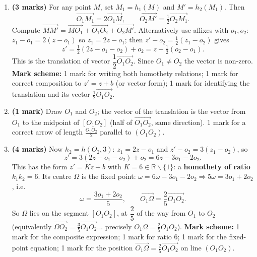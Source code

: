 \documentclass[11pt]{article}
\def\setminus{\mathbin{\backslash}}\let\smallsetminus\setminus
\begin{document}
\begin{corrige}
\begin{enumerate}
\item \textbf{(3 marks)} For any point $M$, set $M_1 = h_1(M)$ and $M' = h_2(M_1)$. Then
\[ \overrightarrow{O_1 M_1} = 2\overrightarrow{O_1 M}, \qquad \overrightarrow{O_2 M'} = \tfrac12 \overrightarrow{O_2 M_1}. \]
Compute $\overrightarrow{MM'} = \overrightarrow{MO_1} + \overrightarrow{O_1O_2} + \overrightarrow{O_2M'}$. Alternatively use affixes with $o_1, o_2$: $z_1 - o_1 = 2(z-o_1)$ so $z_1 = 2z - o_1$; then $z' - o_2 = \tfrac12(z_1 - o_2)$ gives
\[ z' = \tfrac12(2z - o_1 - o_2) + o_2 = z + \tfrac12(o_2 - o_1). \]
This is the translation of vector $\dfrac12 \overrightarrow{O_1O_2}$. Since $O_1 \neq O_2$ the vector is non-zero. \textbf{Mark scheme:} 1 mark for writing both homothety relations; 1 mark for correct composition to $z' = z + b$ (or vector form); 1 mark for identifying the translation and its vector $\frac12\overrightarrow{O_1O_2}$.
\item \textbf{(1 mark)} Draw $O_1$ and $O_2$; the vector of the translation is the vector from $O_1$ to the midpoint of $[O_1O_2]$ (half of $\overrightarrow{O_1O_2}$, same direction). 1 mark for a correct arrow of length $\frac{O_1O_2}{2}$ parallel to $(O_1O_2)$.
\item \textbf{(4 marks)} Now $h_2 = h(O_2,3)$: $z_1 = 2z - o_1$ and $z' - o_2 = 3(z_1 - o_2)$, so
\[ z' = 3(2z - o_1 - o_2) + o_2 = 6z - 3o_1 - 2o_2. \]
This has the form $z' = Kz + b$ with $K = 6 \in \mathbb{R}\setminus\{1\}$: a \textbf{homothety of ratio $k_1k_2 = 6$}. Its centre $\Omega$ is the fixed point: $\omega = 6\omega - 3o_1 - 2o_2 \Rightarrow 5\omega = 3o_1 + 2o_2$, i.e.
\[ \omega = \frac{3o_1 + 2o_2}{5}, \qquad \overrightarrow{O_1\Omega} = \frac{2}{5}\overrightarrow{O_1O_2}. \]
So $\Omega$ lies on the segment $[O_1O_2]$, at $\dfrac{2}{5}$ of the way from $O_1$ to $O_2$ (equivalently $\overrightarrow{\Omega O_2} = \frac35\overrightarrow{O_1O_2}$... precisely $O_1\Omega = \frac25 O_1O_2$). \textbf{Mark scheme:} 1 mark for the composite expression; 1 mark for ratio $6$; 1 mark for the fixed-point equation; 1 mark for the position $\overrightarrow{O_1\Omega} = \frac25\overrightarrow{O_1O_2}$ on line $(O_1O_2)$.
\end{enumerate}
\end{corrige}
\end{document}
